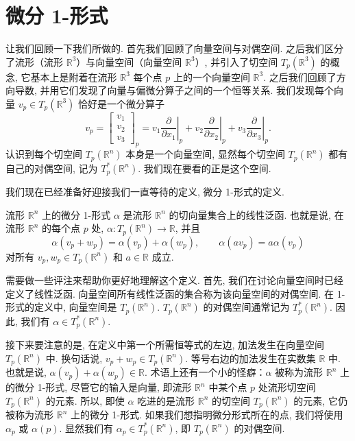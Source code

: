 \section{微分 1-形式}

让我们回顾一下我们所做的. 首先我们回顾了向量空间与对偶空间. 之后我们区分了流形（流形 $\mathbb{R}^3$）与向量空间（向量空间 $\mathbb{R}^3$）, 并引入了切空间 $T_p(\mathbb{R}^3)$ 的概念, 它基本上是附着在流形 $\mathbb{R}^3$ 每个点 $p$ 上的一个向量空间 $\mathbb{R}^3$. 之后我们回顾了方向导数, 并用它们发现了向量与偏微分算子之间的一个恒等关系. 我们发现每个向量 $v_p\in T_p(\mathbb{R}^3)$ 恰好是一个微分算子
\[
v_p=\begin{bmatrix}v_1\\v_2\\v_3\end{bmatrix}_p=v_1\left.\frac{\partial}{\partial x_1}\right|_{p}+v_2\left.\frac{\partial}{\partial x_2}\right|_{p}+v_3\left.\frac{\partial}{\partial x_3}\right|_{p}.
\]
认识到每个切空间 $T_p(\mathbb{R}^n)$ 本身是一个向量空间, 显然每个切空间 $T_p(\mathbb{R}^n)$ 都有自己的对偶空间, 记为 $T_p^*(\mathbb{R}^n)$. 我们现在要看的正是这个空间.

我们现在已经准备好迎接我们一直等待的定义, 微分 1-形式的定义.

\begin{definition}[微分 1-形式]\label{def:2-4-1}
流形 $\mathbb{R}^n$ 上的微分 1-形式 $\alpha$ 是流形 $\mathbb{R}^n$ 的切向量集合上的线性泛函. 也就是说, 在流形 $\mathbb{R}^n$ 的每个点 $p$ 处, $\alpha:T_p(\mathbb{R}^n)\to\mathbb{R}$, 并且
\[
\alpha(v_p+w_p)=\alpha(v_p)+\alpha(w_p),\qquad \alpha(av_p)=a\alpha(v_p)
\]
对所有 $v_p,w_p\in T_p(\mathbb{R}^n)$ 和 $a\in\mathbb{R}$ 成立.
\end{definition}

需要做一些评注来帮助你更好地理解这个定义. 首先, 我们在讨论向量空间时已经定义了线性泛函. 向量空间所有线性泛函的集合称为该向量空间的对偶空间. 在 1-形式的定义中, 向量空间是 $T_p(\mathbb{R}^n)$. $T_p(\mathbb{R}^n)$ 的对偶空间通常记为 $T_p^*(\mathbb{R}^n)$. 因此, 我们有 $\alpha\in T_p^*(\mathbb{R}^n)$.

接下来要注意的是, 在定义中第一个所需恒等式的左边, 加法发生在向量空间 $T_p(\mathbb{R}^n)$ 中. 换句话说, $v_p+w_p\in T_p(\mathbb{R}^n)$. 等号右边的加法发生在实数集 $\mathbb{R}$ 中. 也就是说, $\alpha(v_p)+\alpha(w_p)\in\mathbb{R}$. 术语上还有一个小的怪癖：$\alpha$ 被称为流形 $\mathbb{R}^n$ 上的微分 1-形式, 尽管它的输入是向量, 即流形 $\mathbb{R}^n$ 中某个点 $p$ 处流形切空间 $T_p(\mathbb{R}^n)$ 的元素. 所以, 即使 $\alpha$ 吃进的是流形 $\mathbb{R}^n$ 的切空间 $T_p(\mathbb{R}^n)$ 的元素, 它仍被称为流形 $\mathbb{R}^n$ 上的微分 1-形式. 如果我们想指明微分形式所在的点, 我们将使用 $\alpha_p$ 或 $\alpha(p)$. 显然我们有 $\alpha_p\in T_p^*(\mathbb{R}^n)$, 即 $T_p(\mathbb{R}^n)$ 的对偶空间.

